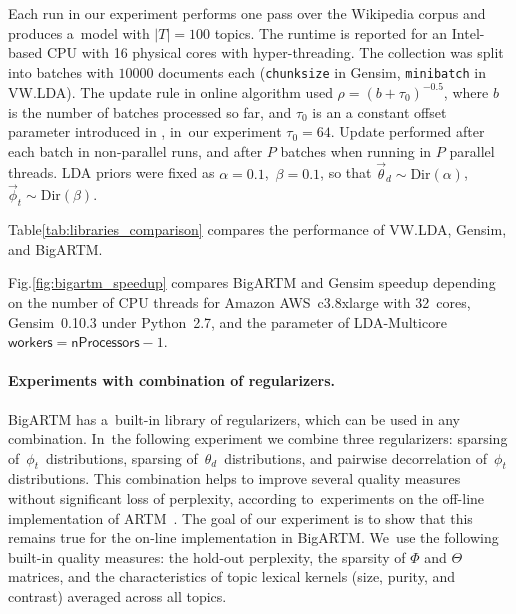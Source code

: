 \documentclass[russian]{llncs}
\newcommand{\kw}[1]{\textsf{#1}}
\begin{document}
Each run in our experiment performs one pass over the Wikipedia corpus and produces a~model with $|T|=100$ topics.
The runtime is reported for an Intel-based CPU with 16 physical cores with hyper-threading.
The collection was split into batches with $10 000$ documents each
(\texttt{chunksize} in Gensim, \texttt{minibatch} in VW.LDA).
The update rule in online algorithm used 
${\rho = (b + \tau_0)^{-0.5}}$, 
where $b$ is the number of batches processed so far,
and $\tau_0$ is an a constant offset parameter introduced in \cite{hoffman10online}, 
in~our experiment ${\tau_0 = 64}$.
Update performed after each batch in non-parallel runs, and after $P$ batches when running in $P$ parallel threads.
LDA priors were fixed as 
${\alpha = 0.1}$,\, ${\beta = 0.1}$, 
so that 
$\vec{\theta}_d \sim \text{Dir}(\alpha)$,\, 
$\vec{\phi}_t \sim \text{Dir}(\beta)$.

Table\;\ref{tab:libraries_comparison} compares the performance of VW.LDA, Gensim, and BigARTM.

Fig.\;\ref{fig:bigartm_speedup} compares BigARTM and Gensim speedup depending on the number of CPU threads
for Amazon AWS~c3.8xlarge with 32~cores, 
Gensim~\mbox{0.10.3} under Python~\mbox{2.7}, 
and the parameter of LDA-Multicore $\kw{workers}=\kw{nProcessors}-1$.


\paragraph{Experiments with combination of regularizers.}

BigARTM has a~built-in library of regularizers, which can be used in any combination.  
In~the following experiment we combine three regularizers:
sparsing of~$\phi_{t}$~distributions, 
sparsing of~$\theta_{d}$~distributions, and
pairwise decorrelation of~$\phi_{t}$ distributions.
This combination helps to improve several quality measures without significant loss of perplexity,
according to~experiments on the off-line implementation of ARTM~\cite{voron14aist}.
The goal of our experiment is to show that this remains true 
for the on-line implementation in BigARTM.
We~use the following built-in quality measures:
the hold-out perplexity, 
the sparsity of $\Phi$ and $\Theta$ matrices, and 
the characteristics of topic lexical kernels (size, purity, and contrast) averaged across all topics.
\end{document}
